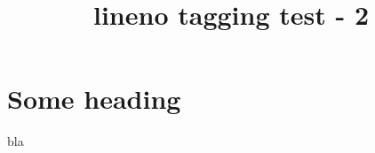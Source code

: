 \documentclass{article}
\title{lineno tagging test - 2}
\begin{document}
\section{Some heading}

bla\lipsum[1]
\end{document}
